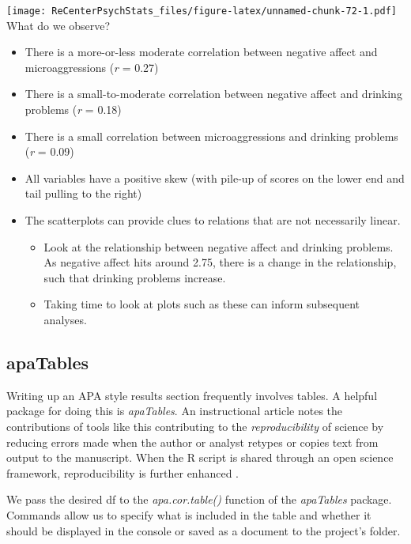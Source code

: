 \documentclass[
  11pt,
]{book}
\providecommand{\tightlist}{%
  \setlength{\itemsep}{0pt}\setlength{\parskip}{0pt}}
\begin{document}
\texttt{[image: ReCenterPsychStats\_files/figure-latex/unnamed-chunk-72-1.pdf]}
What do we observe?

\begin{itemize}
\tightlist
\item
  There is a more-or-less moderate correlation between negative affect and microaggressions (\emph{r} = 0.27)
\item
  There is a small-to-moderate correlation between negative affect and drinking problems (\emph{r} = 0.18)
\item
  There is a small correlation between microaggressions and drinking problems (\emph{r} = 0.09)
\item
  All variables have a positive skew (with pile-up of scores on the lower end and tail pulling to the right)
\item
  The scatterplots can provide clues to relations that are not necessarily linear.

  \begin{itemize}
  \tightlist
  \item
    Look at the relationship between negative affect and drinking problems. As negative affect hits around 2.75, there is a change in the relationship, such that drinking problems increase.
  \item
    Taking time to look at plots such as these can inform subsequent analyses.
  \end{itemize}
\end{itemize}

\hypertarget{apatables}{%
\subsection{apaTables}\label{apatables}}

Writing up an APA style results section frequently involves tables. A helpful package for doing this is \emph{apaTables}. An instructional article notes the contributions of tools like this contributing to the \emph{reproducibility} of science by reducing errors made when the author or analyst retypes or copies text from output to the manuscript. When the R script is shared through an open science framework, reproducibility is further enhanced \citep{stanley_reproducible_2018}.

We pass the desired df to the \emph{apa.cor.table()} function of the \emph{apaTables} package. Commands allow us to specify what is included in the table and whether it should be displayed in the console or saved as a document to the project's folder.
\end{document}
